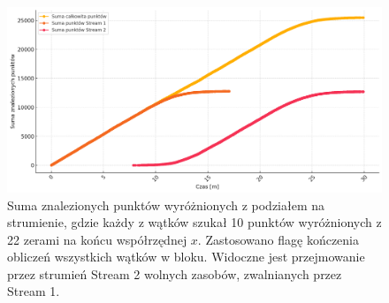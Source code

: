 \begin{figure}[H]
    \centering
    \includegraphics[width=1\textwidth]{img/streams.png}
    \caption{Suma znalezionych punktów wyróżnionych z podziałem na strumienie,
        gdzie każdy z wątków szukał 10 punktów wyróżnionych z 22 zerami na końcu współrzędnej $x$.
        Zastosowano flagę kończenia obliczeń wszystkich wątków w bloku.
        Widoczne jest przejmowanie przez strumień Stream 2 wolnych zasobów, zwalnianych przez Stream 1.
    }
    \label{fig:tail_effect_3}
\end{figure}

